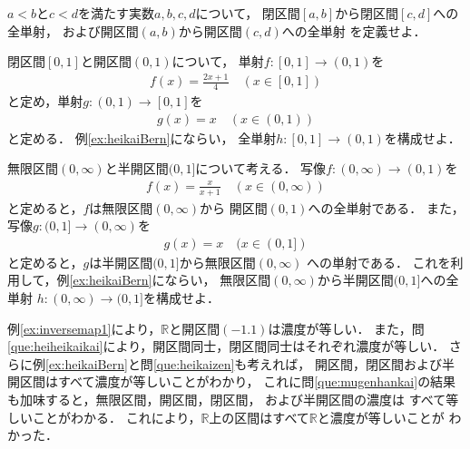    \begin{que} \label{que:heiheikaikai}
     $a<b$と$c<d$を満たす実数$a,b,c,d$について，
     閉区間$[a,b]$から閉区間$[c,d]$への全単射，
     および開区間$(a,b)$から開区間$(c,d)$への全単射
     を定義せよ．
   \end{que}

   \begin{que} \label{que:heikaizen}
     閉区間$[0,1]$と開区間$(0,1)$について，
     単射$f: [0,1] \longrightarrow (0,1)$を
     \begin{align*}
       f(x) = \frac{2x+1}{4} \quad ( x \in [0,1] )  
     \end{align*}
     と定め，単射$g:(0,1) \longrightarrow [0,1]$を
     \begin{align*}
       g(x) = x \quad ( x \in (0,1) )
     \end{align*}
     と定める．
     例\ref{ex:heikaiBern}にならい，
     全単射$h: [0,1] \longrightarrow (0,1)$を構成せよ．
   \end{que}

   \begin{que} \label{que:mugenhankai}
     無限区間$(0, \infty) $と半開区間$(0,1]$について考える．
     写像$f: (0, \infty ) \longrightarrow (0,1)$を
     \begin{align*}
       f(x) = \frac{ x}{x+1} \quad ( x \in ( 0, \infty )) 
     \end{align*}
     と定めると，$f$は無限区間$( 0, \infty)$から
     開区間$(0,1)$への全単射である．
     また，写像$g: (0,1] \longrightarrow (0, \infty )$を
     \begin{align*}
       g(x) = x \quad ( x \in (0,1] )
     \end{align*}
     と定めると，$g$は半開区間$(0,1]$から無限区間$(0, \infty)$
     への単射である．
     これを利用して，例\ref{ex:heikaiBern}にならい，
     無限区間$(0, \infty )$から半開区間$(0,1]$への全単射
     $h: (0, \infty) \longrightarrow (0, 1]$を構成せよ．
   \end{que}

   例\ref{ex:inversemap1}により，$\mathbb{R}$と開区間$(-1.1)$は濃度が等しい．
   また，問\ref{que:heiheikaikai}により，開区間同士，閉区間同士はそれぞれ濃度が等しい．
   さらに例\ref{ex:heikaiBern}と問\ref{que:heikaizen}も考えれば，
   開区間，閉区間および半開区間はすべて濃度が等しいことがわかり，
   これに問\ref{que:mugenhankai}の結果も加味すると，無限区間，開区間，閉区間，
   および半開区間の濃度は
   すべて等しいことがわかる．
   これにより，$\mathbb{R}$上の区間はすべて$\mathbb{R}$と濃度が等しいことが
   わかった．

